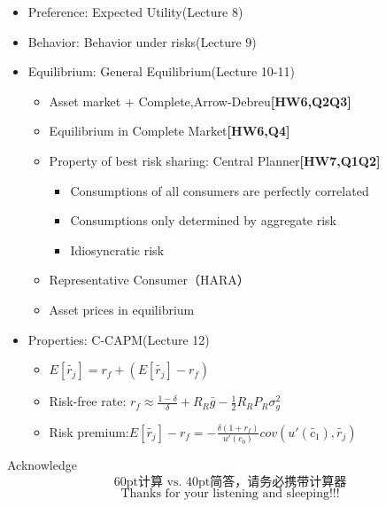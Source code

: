 \documentclass{beamer}
\begin{document}
	\begin{frame}
	\begin{itemize}
		\item Preference: Expected Utility(Lecture 8)
		\item Behavior: Behavior under risks(Lecture 9)
		\item Equilibrium: General Equilibrium(Lecture 10-11)
			\begin{itemize}
				\item Asset market + Complete,Arrow-Debreu\textbf{[HW6,Q2Q3]}
				\item Equilibrium in Complete Market\textbf{[HW6,Q4]}
			\end{itemize}
			\begin{itemize}
				\item Property of best risk sharing: Central Planner\textbf{[HW7,Q1Q2]}
					\begin{itemize}
						\item Consumptions of all consumers are perfectly correlated
						\item Consumptions only determined by aggregate risk
						\item Idiosyncratic risk 
					\end{itemize}
				\item Representative Consumer（HARA）
				\item Asset prices in equilibrium
			\end{itemize}
		\item Properties: C-CAPM(Lecture 12)
			\begin{itemize}
				\item $E[\tilde{r_j}]=r_f+(E[\tilde{r_j}]-r_f)$
				\item Risk-free rate: $r_f\approx \frac{1-\delta}{\delta}+R_R\bar{g}-\frac{1}{2}R_RP_R\sigma_g^2$
				\item Risk premium:$E[\tilde{r_j}]-r_f=-\frac{\delta(1+r_f)}{u'(c_0)}cov(u'(\tilde{c_1}),\tilde{r_j})$
			\end{itemize}
	\end{itemize}
	\end{frame}
	
 	\begin{frame}{Acknowledge}
 		$$\text{60pt计算 vs. 40pt简答，请务必携带计算器}$$
		$$\text{Thanks for your listening and sleeping!!!}$$
 	\end{frame}



\end{document}
